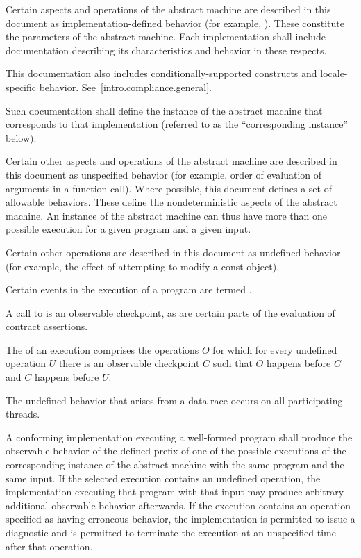 \pnum
{}%
Certain aspects and operations of the abstract machine are described in this
document as implementation-defined behavior (for example,
). These constitute the parameters of the abstract machine.
Each implementation shall include documentation describing its characteristics
and behavior in these respects.
\begin{footnote}
This documentation also includes
conditionally-supported constructs and locale-specific behavior.
See~\ref{intro.compliance.general}.
\end{footnote}
Such documentation shall define the instance of the
abstract machine that corresponds to that implementation (referred to as the
``corresponding instance'' below).

\pnum
{}%
Certain other aspects and operations of the abstract machine are
described in this document as unspecified behavior (for example,
order of evaluation of arguments in a function call).
Where possible, this
document defines a set of allowable behaviors. These
define the nondeterministic aspects of the abstract machine. An instance
of the abstract machine can thus have more than one possible execution
for a given program and a given input.

\pnum
{}%
Certain other operations are described in this document as
undefined behavior (for example, the effect of
attempting to modify a const object).

\pnum
Certain events in the execution of a program
are termed .
\begin{note}
A call to 
is an observable checkpoint,
as are certain parts of
the evaluation of contract assertions.
\end{note}

\pnum
{}%
%
The  of an execution
comprises the operations $O$
for which for every undefined operation $U$
there is an observable checkpoint $C$
such that $O$ happens before $C$ and
$C$ happens before $U$.

\begin{note}
The undefined behavior that arises from a data race
occurs on all participating threads.
\end{note}

A conforming implementation executing a well-formed program shall
produce the observable behavior
of the defined prefix
of one of the possible executions
of the corresponding instance
of the abstract machine with the
same program and the same input.
%
If the selected execution contains an undefined operation,
the implementation executing that program with that input
may produce arbitrary additional observable behavior afterwards.
If the execution contains an operation specified as having erroneous behavior,
the implementation is permitted to issue a diagnostic and
is permitted to terminate the execution
at an unspecified time after that operation.


